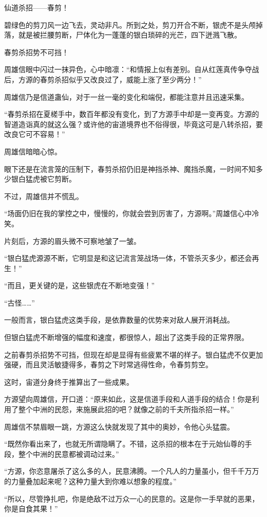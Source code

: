 \begin{this_body}
仙道杀招——春剪！

碧绿色的剪刀风一边飞去，灵动非凡。所到之处，剪刀开合不断，银虎不是头颅掉落，就是被拦腰剪断，尸体化为一蓬蓬的银白琐碎的光芒，四下迸溅飞散。

春剪杀招势不可挡！

周雄信眼中闪过一抹异色，心中暗凛：“和情报上似有差别。自从红莲真传争夺战后，方源的春剪杀招似乎又改良过了，威能上涨了至少两分！”

周雄信乃是信道蛊仙，对于一丝一毫的变化和端倪，都能注意并且迅速采集。

“春剪杀招在夏槎手中，数百年都没有变化，到了方源手中却是一变再变。方源的智道造诣真的就这么强？或许他的宙道境界也不俗得很，毕竟这可是八转杀招，要改良它可不容易！”

周雄信暗暗心惊。

眼下还是在流言笼的压制下，春剪杀招仍旧是神挡杀神、魔挡杀魔，一时间不知多少银白猛虎被它剪断。

不过，周雄信并不慌乱。

“场面仍旧在我的掌控之中，慢慢的，你就会尝到厉害了，方源啊。”周雄信心中冷笑。

片刻后，方源的眉头微不可察地皱了一皱。

“银白猛虎源源不断，它明显是和这记流言笼战场一体，不管杀灭多少，都还会再生！”

“而且，更关键的是，这些银虎在不断地变强！”

“古怪……”

一般而言，银白猛虎这类手段，是依靠数量的优势来对敌人展开消耗战。

但银白猛虎不断增强的幅度和速度，都很惊人，超出了这类手段的正常界限。

之前春剪杀招势不可挡，但现在却是显得有些疲累不堪的样子。银白猛虎不仅更加强硬，而且灵活敏捷得多，春剪之下时常逃得性命，令春剪剪空。

这时，宙道分身终于推算出了一些成果。

方源望向周雄信，开口道：“原来如此，这是信道手段和人道手段的结合！你是利用了整个中洲的民怨，来施展此招的吧？就像之前的千夫所指杀招一样。”

周雄信不禁眉眼一跳，方源这么快就发现了其中的奥妙，令他心头猛震。

“既然你看出来了，也就无所谓隐瞒了。不错，这杀招的根本在于元始仙尊的手段，整个中洲的民意都被调动过来。”

“方源，你恣意屠杀了这么多的人，民意沸腾。一个凡人的力量虽小，但千千万万的力量叠加起来呢？这种力量大到你难以想象的程度。”

“所以，尽管挣扎吧，你是绝敌不过万众一心的民意的。这是你一手早就的恶果，你是自食其果！”


\end{this_body}
